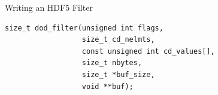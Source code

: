 \documentclass{beamer}
\begin{document}
\begin{frame}[fragile]{Writing an HDF5 Filter}
  \begin{verbatim}
size_t dod_filter(unsigned int flags,
                  size_t cd_nelmts,
                  const unsigned int cd_values[],
                  size_t nbytes,
                  size_t *buf_size,
                  void **buf);
  \end{verbatim}
\end{frame}
\end{document}
